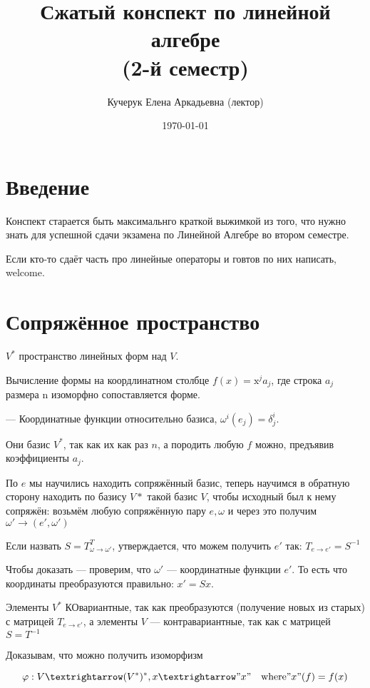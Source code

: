 \documentclass[12pt, a4paper]{article}
\title{Сжатый конспект по линейной алгебре \\(2-й семестр)}
\author{
  \vova
  \and
  Кучерук Елена Аркадьевна (лектор)
}
\date{\today}
\begin{document}
\maketitle
\newpage
\tableofcontents
\newpage


\section{Введение}

    Конспект старается быть максимальнго краткой выжимкой из того, 
    что нужно знать для успешной сдачи экзамена по Линейной Алгебре во втором семестре.

    Если кто-то сдаёт часть про линейные операторы и говтов по них написать, welcome.

\section{Сопряжённое пространство}

$V^*$ пространство линейных форм над $V$.

Вычисление формы на коордлинатном столбце $f(x) = \mathrm{x}^j a_j$, 
где строка $a_j$ размера n изоморфно сопоставляется форме.

— Координатные функции относительно базиса, $\omega^i(e_j) = \delta^i_j$.

Они базис $V^*$, так как их как раз $n$, а породить любую $f$ можно, предъявив коэффициенты $a_j$.

По $e$ мы научились находить сопряжённый базис, теперь научимся в обратную сторону 
находить по базису $V*$ такой базис $V$, чтобы исходный был к нему сопряжён:
возьмём любую сопряжённую пару $e, \omega$ 
и через это получим $\omega' → (e', \omega')$

Если назвать $S = T_{\omega → \omega'}^T$, утверждается, 
что можем получить $e'$ так: $T_{e → e'} = S^{-1}$

Чтобы доказать — проверим, что $\omega'$ — координатные функции $e'$.
То есть что координаты преобразуются правильно: $x' = S x$.

Элементы $V^*$ КОвариантные, так как преобразуются (получение новых из старых) 
с матрицей $T_{e → e'}$, 
а элементы $V$ — контравариантные, так как с матрицей $S = T^{-1}$

Доказывам, что можно получить изоморфизм 

\begin{equation}
    \varphi: V → (V^*)^*, x → "x" \quad \mathrm{where} "x"(f) = f(x)
\end{equation}
\end{document}

